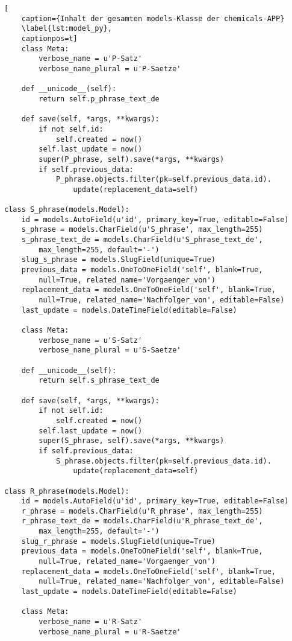 \begin{lstlisting}[
    caption={Inhalt der gesamten models-Klasse der chemicals-APP}
    \label{lst:model_py},
    captionpos=t]
    class Meta:
        verbose_name = u'P-Satz'
        verbose_name_plural = u'P-Saetze'

    def __unicode__(self):
        return self.p_phrase_text_de

    def save(self, *args, **kwargs):
        if not self.id:
            self.created = now()
        self.last_update = now()
        super(P_phrase, self).save(*args, **kwargs)
        if self.previous_data:
            P_phrase.objects.filter(pk=self.previous_data.id).
                update(replacement_data=self)

class S_phrase(models.Model):
    id = models.AutoField(u'id', primary_key=True, editable=False)
    s_phrase = models.CharField(u'S_phrase', max_length=255)
    s_phrase_text_de = models.CharField(u'S_phrase_text_de', 
        max_length=255, default='-')
    slug_s_phrase = models.SlugField(unique=True)
    previous_data = models.OneToOneField('self', blank=True, 
        null=True, related_name='Vorgaenger_von')
    replacement_data = models.OneToOneField('self', blank=True, 
        null=True, related_name='Nachfolger_von', editable=False)
    last_update = models.DateTimeField(editable=False)

    class Meta:
        verbose_name = u'S-Satz'
        verbose_name_plural = u'S-Saetze'

    def __unicode__(self):
        return self.s_phrase_text_de

    def save(self, *args, **kwargs):
        if not self.id:
            self.created = now()
        self.last_update = now()
        super(S_phrase, self).save(*args, **kwargs)
        if self.previous_data:
            S_phrase.objects.filter(pk=self.previous_data.id).
                update(replacement_data=self)

class R_phrase(models.Model):
    id = models.AutoField(u'id', primary_key=True, editable=False)
    r_phrase = models.CharField(u'R_phrase', max_length=255)
    r_phrase_text_de = models.CharField(u'R_phrase_text_de', 
        max_length=255, default='-')
    slug_r_phrase = models.SlugField(unique=True)
    previous_data = models.OneToOneField('self', blank=True, 
        null=True, related_name='Vorgaenger_von')
    replacement_data = models.OneToOneField('self', blank=True, 
        null=True, related_name='Nachfolger_von', editable=False)
    last_update = models.DateTimeField(editable=False)

    class Meta:
        verbose_name = u'R-Satz'
        verbose_name_plural = u'R-Saetze'


\end{lstlisting}
